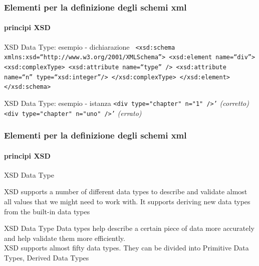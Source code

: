 \begin{frame}
	\frametitle{Elementi per la definizione degli schemi xml}
	\framesubtitle{principi XSD}
	\addtocounter{nframe}{1}

	\begin{block}{XSD Data Type: esempio -  dichiarazione}
		\texttt{
			<xsd:schema xmlns:xsd=``http://www.w3.org/2001/XMLSchema''>
			<xsd:element name=``div''>
			<xsd:complexType>
			<xsd:attribute name=``type'' />
			<xsd:attribute name=``n'' type=``xsd:integer''/>
			</xsd:complexType>
			</xsd:element>
			</xsd:schema>
		}


	\end{block}

	\begin{block}{XSD Data Type: esempio - istanza}
		\texttt{<div type="chapter" n="1" />'} \textit{(corretto)}
		\\\texttt{<div type="chapter" n="uno" />'} \textit{(errato)}

	\end{block}



\end{frame}

\begin{frame}
	\frametitle{Elementi per la definizione degli schemi xml}
	\framesubtitle{principi XSD}
	\addtocounter{nframe}{1}

	\begin{block}{XSD Data Type}


		XSD supports a number of different data types to describe and validate almost all values that we might need to work with.
		It supports deriving new data types from the built-in data types


	\end{block}

	\begin{block}{XSD Data Type}
		Data types help describe a certain piece of data more accurately and help validate them more efficiently.
		\\ XSD supports almost fifty data types. They can be divided into Primitive Data Types, Derived Data Types

	\end{block}



\end{frame}

